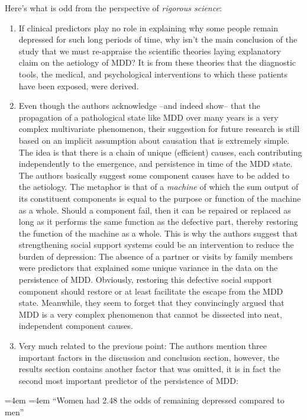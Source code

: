 \documentclass[12pt,]{book}
\renewenvironment{quote}{%
  \par \small \medskip \block
  \leftskip=4em \rightskip=4em%
  \noindent \ignorespaces}{%
  \par \medskip
  }
\begin{document}
Here's what is odd from the perspective of \emph{rigorous science}:

\begin{enumerate}
\def\labelenumi{\arabic{enumi}.}
\item
  If clinical predictors play no role in explaining why some people remain depressed for such long periods of time, why isn't the main conclusion of the study that we must re-appraise the scientific theories laying explanatory claim on the aetiology of MDD? It is from these theories that the diagnostic tools, the medical, and psychological interventions to which these patients have been exposed, were derived.
\item
  Even though the authors acknowledge --and indeed show-- that the propagation of a pathological state like MDD over many years is a very complex multivariate phenomenon, their suggestion for future research is still based on an implicit assumption about causation that is extremely simple. The idea is that there is a chain of unique (efficient) causes, each contributing independently to the emergence, and persistence in time of the MDD state. The authors basically suggest some component causes have to be added to the aetiology. The metaphor is that of a \emph{machine} of which the sum output of its constituent components is equal to the purpose or function of the machine as a whole. Should a component fail, then it can be repaired or replaced as long as it performs the same function as the defective part, thereby restoring the function of the machine as a whole. This is why the authors suggest that strengthening social support systems could be an intervention to reduce the burden of depression: The absence of a partner or visits by family members were predictors that explained some unique variance in the data on the persistence of MDD. Obviously, restoring this defective social support component should restore or at least facilitate the escape from the MDD state. Meanwhile, they seem to forget that they convincingly argued that MDD is a very complex phenomenon that cannot be dissected into neat, independent component causes.
\item
  Very much related to the previous point: The authors mention three important factors in the discussion and conclusion section, however, the results section contains another factor that was omitted, it is in fact the second most important predictor of the persistence of MDD:
\end{enumerate}

\begin{quote}
``Women had 2.48 the odds of remaining depressed compared to men''
\end{quote}
\end{document}
